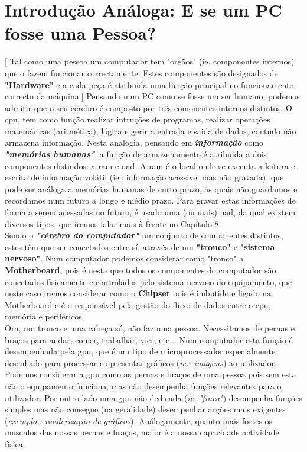 \section{Introdução Análoga: E se um PC fosse uma Pessoa?}
\label{sec.analoga}
[ Tal como uma pessoa um computador tem "orgãos" (ie. componentes internos) que o fazem funcionar correctamente. Estes componentes são designados de \textbf{"Hardware"} e a cada peça é atribuida uma função principal no funcionamento correcto da máquina.]
Pensando num PC como se fosse um ser humano, podemos admitir que o seu cerebro é composto por três comonentes internos distintos. O \ac{cpu}, tem como função realizar intruções de programas, realizar operações matemáricas (aritmética), lógica e gerir a entrada e saida de dados, contudo não armazena informação. Nesta analogia\footnotemark[1], pensando em \textbf{\textsl{informação}} como \textbf{\textsl{"memórias humanas"}}, a função de armazenamento é atribuida a dois componentes distindos: a \ac{ram} e \ac{uad}. A \ac{ram} é o local onde se executa a leitura e escrita de informação volátil (ie.: informação acessivel mas não gravada), que pode ser análoga a memórias humanas de curto prazo, as quais não guardamos e recordamos num futuro a longo e médio prazo. Para gravar estas informações de forma a serem acessadas no futuro, é usado uma (ou mais) \acf{uad}, da qual existem diversos tipos, que iremos falar mais à frente no Capítulo 8. \\
Sendo o \textbf{\textsl{"cérebro do computador"}} um conjunto de componentes distintos, estes têm que ser conectados entre sí, através de um \textbf{"tronco"} e \textbf{"sistema nervoso"}. Num computador podemos considerar como "tronco" a \textbf{Motherboard}, pois é nesta que todos os componentes do compotador são conectados físicamente e controlados pelo sistema nervoso do equipamento, que neste caso iremos considerar como o \textbf{Chipset} pois é imbutido e ligado na Motherboard e é o responsável pela gestão do fluxo de dados entre o \ac{cpu}, memória e periféricos. \\
Ora, um tronco e uma cabeça só, não faz uma pessoa. Necessitamos de pernas e braços para andar, comer, trabalhar, vier, etc... Num computador esta função é desempenhada pela \ac{gpu}, que é um tipo de microprocessador especialmente desenhado para processar e apresentar gráficos (\textit{ie.: imagens}) ao utilizador. Podemos considerar a \ac{gpu} como as pernas e braços de uma pessoa pois sem esta não o equipamento funciona, mas não desempenha funções relevantes para o utilizador. Por outro lado uma \ac{gpu} não dedicada (\textit{ie.:"fraca"}) desempenha funções simples mas não consegue (na geralidade) desempenhar acções mais exigentes (\textit{exemplo.: renderização de gráficos}). Análogamente, quanto mais fortes os musculos das nossas pernas e braços, maior é a nossa capacidade actividade física. \\ 
